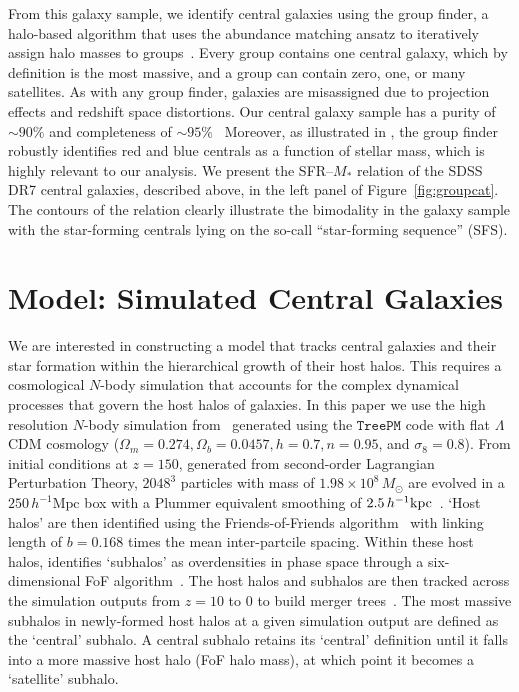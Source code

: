 \documentclass[12pt, letterpaper, preprint, tighten]{aastex62}
\begin{document}
From this galaxy sample, we identify central galaxies using the
\cite{tinker2011} group finder, a halo-based algorithm that uses
the abundance matching ansatz to iteratively assign halo masses to
groups~\citep[see also][]{yang2005}. Every group contains one
central galaxy, which by definition is the most massive, and a group can
contain zero, one, or many satellites. As with any group finder, galaxies are misassigned due to projection
effects and redshift space distortions. Our central galaxy sample has
a purity of ${\sim}90\%$ and completeness of ${\sim}95\%$~\citep{tinker2018}
Moreover, as illustrated in \cite{campbell2015}, the \cite{tinker2011} group
finder robustly identifies red and blue centrals as a function of stellar mass,
which is highly relevant to our analysis.
We present the SFR--$M_*$ relation of the SDSS DR7 central galaxies, described
above, in the left panel of Figure~\ref{fig:groupcat}. The contours of the
relation clearly illustrate the bimodality in the galaxy sample with the
star-forming centrals lying on the so-call ``star-forming sequence'' (SFS).

\section{Model: Simulated Central Galaxies} \label{sec:sim}
We are interested in constructing a model that tracks central galaxies and
their star formation within the hierarchical growth of their host halos. This
requires a cosmological $N$-body simulation that accounts for the complex
dynamical processes that govern the host halos of galaxies. In this paper
we use the high resolution $N$-body simulation from~\cite{wetzel2013} generated
using the \cite{white2002} $\mathtt{TreePM}$ code with flat $\Lambda$CDM cosmology
($\Omega_m =0.274, \Omega_b = 0.0457, h = 0.7, n=0.95$, and $\sigma_8 = 0.8$).
From initial conditions at $z = 150$, generated from second-order Lagrangian
Perturbation Theory, $2048^3$ particles with mass of $1.98 \times 10^8\,M_\odot$ are
evolved in a $250\,h^{-1}\mathrm{Mpc}$ box with a Plummer equivalent smoothing of
$2.5\,h^{-1}{\rm kpc}$~\citep{wetzel2013, wetzel2014}. `Host halos' are then
identified using the Friends-of-Friends algorithm~\citep[FoF;][]{davis1985} with
linking length of $b{=}0.168$ times the mean inter-partcile spacing. Within
these host halos, \cite{wetzel2013} identifies `subhalos' as overdensities
in phase space through a six-dimensional FoF algorithm~\citep[FoF6D;][]{white2010}.
The host halos and subhalos are then tracked across the simulation outputs
from $z = 10$ to $0$ to build merger trees~\citep{wetzel2009,wetzel2010}.
The most massive subhalos in newly-formed host halos at a given simulation
output are defined as the `central' subhalo. A central subhalo retains its
`central' definition until it falls into a more massive host halo
(FoF halo mass), at which point it becomes a `satellite' subhalo.
\end{document}
